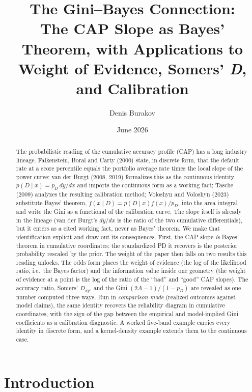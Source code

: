 \documentclass[12pt]{article}
\newcommand{\pD}{p_D}
\newcommand{\PDx}{p(D \mid x)}
\begin{document}
\onehalfspacing

\title{The Gini--Bayes Connection:\\[0.3em]
\large The CAP Slope as Bayes' Theorem, with Applications to\\
Weight of Evidence, Somers' \emph{D}, and Calibration}
\author{Denis Burakov}
\date{June 2026}
\maketitle

\begin{abstract}
\noindent
The probabilistic reading of the cumulative accuracy profile (CAP) has a long industry
lineage. Falkenstein, Boral and Carty (2000) state, in discrete form, that the default
rate at a score percentile equals the portfolio average rate times the local slope of
the power curve; van der Burgt (2008, 2019) formalizes this as the continuous identity
$\PDx = \pD\, dy/dx$ and imports the continuous form as a working fact; Tasche (2009) analyzes the
resulting calibration method; Voloshyn and Voloshyn (2023) substitute Bayes' theorem,
$f(x\mid D)=\PDx f(x)/\pD$, into the area integral and write the Gini as a functional of the
calibration curve. The slope itself is already in the lineage (van der Burgt's $dy/dx$ is the
ratio of the two cumulative differentials), but it enters as a cited working fact, never as
Bayes' theorem. We make that identification explicit and draw out its consequences. First, the
CAP slope \emph{is} Bayes' theorem in cumulative coordinates: the standardized PD it recovers is
the posterior probability rescaled by the prior. The weight of the paper then falls on two results this
reading unlocks. The odds form places the weight of evidence (the log of the likelihood ratio, i.e.\ the
Bayes factor) and the information value inside one geometry (the weight of evidence at a point
is the log of the ratio of the ``bad'' and ``good'' CAP slopes). The accuracy ratio, Somers' $D_{xy}$,
and the Gini $(2A-1)/(1-\pD)$ are revealed as one number computed three ways. Run in \emph{comparison
mode} (realized outcomes against model claims), the same identity recovers the reliability
diagram in cumulative coordinates, with the sign of the gap between the empirical and
model-implied Gini coefficients as a calibration diagnostic. A worked five-band example carries every
identity in discrete form, and a kernel-density example extends them to the continuous case.
\end{abstract}

\section{Introduction}
\end{document}
